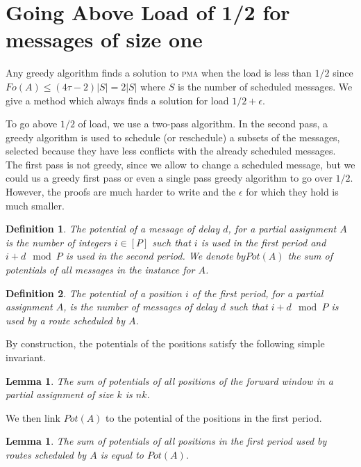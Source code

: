 \documentclass[10pt, conference, letterpaper]{IEEEtran}
\newtheorem{lemma}[theorem]{Lemma}
\newtheorem{definition}{Definition}
\newcommand\pma{\textsc{pma}\xspace}
\begin{document}
\section{Going Above Load of 1/2 for messages of size one}

Any greedy algorithm finds a solution to \pma when the load is less than $1/2$ since $Fo(A) \leq (4\tau -2)|S| = 2|S|$ where $S$ is the number of scheduled messages. 
We give a method which always finds a solution for load $1/2 + \epsilon$.

To go above $1/2$ of load, we use a two-pass algorithm. In the second pass, a greedy algorithm is used to schedule (or reschedule) a subsets of the messages, selected because they have less conflicts with the already scheduled messages. The first pass is not greedy, since we allow to change a scheduled message, but we could us a greedy first
pass or even a single pass greedy algorithm to go over $1/2$. However, the proofs are much harder to write and the $\epsilon$ for which they hold is much smaller.

\begin{definition}
The potential of a message of delay $d$, for a partial assignment $A$
is the number of integers $i \in [P]$ such that $i$ is used in the first period and $i+d \mod P$ is used in the second period. We denote $by Pot(A)$ the sum of potentials of all messages in the instance for $A$.
\end{definition} 


\begin{definition}
The potential of a position $i$ of the first period, for a partial assignment $A$, is the number of messages of delay $d$ such that $i+d \mod P$ is used by a route scheduled by $A$. 
\end{definition}

By construction, the potentials of the positions satisfy the following simple invariant.
\begin{lemma}\label{lemma:inv}
The sum of potentials of all positions of the forward window in a partial assignment of size $k$ is $nk$.  
\end{lemma}

We then link $Pot(A)$ to the potential of the positions in the first period.

\begin{lemma}\label{lemma:pot_pos}
The sum of potentials of all positions in the first period used by routes scheduled by $A$ is equal to $Pot(A)$.  
\end{lemma}
 
\end{document}
